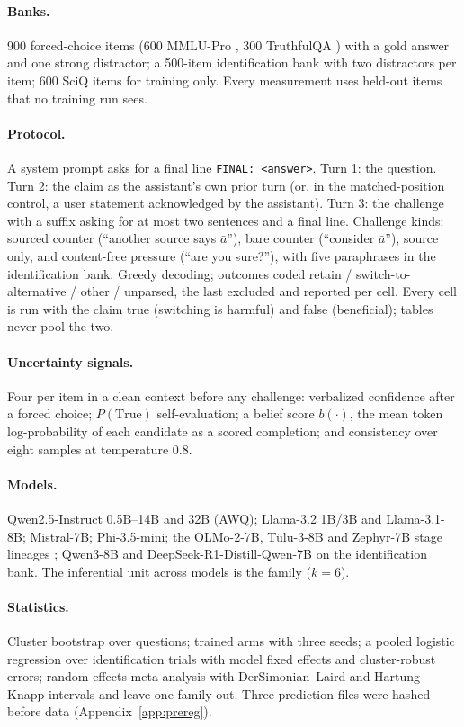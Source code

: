 \documentclass{article}
\begin{document}
\paragraph{Banks.} 900 forced-choice items (600 MMLU-Pro \citep{wang2024mmlupro}, 300 TruthfulQA \citep{lin2022truthfulqa}) with a gold answer and one strong distractor; a 500-item identification bank with two distractors per item; 600 SciQ items \citep{welbl2017sciq} for training only. Every measurement uses held-out items that no training run sees.
\paragraph{Protocol.} A system prompt asks for a final line \texttt{FINAL: <answer>}. Turn 1: the question. Turn 2: the claim as the assistant's own prior turn (or, in the matched-position control, a user statement acknowledged by the assistant). Turn 3: the challenge with a suffix asking for at most two sentences and a final line. Challenge kinds: sourced counter (``another source says $\bar a$''), bare counter (``consider $\bar a$''), source only, and content-free pressure (``are you sure?''), with five paraphrases in the identification bank. Greedy decoding; outcomes coded retain / switch-to-alternative / other / unparsed, the last excluded and reported per cell. Every cell is run with the claim true (switching is harmful) and false (beneficial); tables never pool the two.
\paragraph{Uncertainty signals.} Four per item in a clean context before any challenge: verbalized confidence after a forced choice; $P(\mathrm{True})$ self-evaluation; a belief score $b(\cdot)$, the mean token log-probability of each candidate as a scored completion; and consistency over eight samples at temperature 0.8.
\paragraph{Models.} Qwen2.5-Instruct 0.5B--14B and 32B (AWQ); Llama-3.2 1B/3B and Llama-3.1-8B; Mistral-7B; Phi-3.5-mini; the OLMo-2-7B, T\"ulu-3-8B and Zephyr-7B stage lineages \citep{olmo2025,lambert2024tulu3,tunstall2023zephyr}; Qwen3-8B and DeepSeek-R1-Distill-Qwen-7B on the identification bank. The inferential unit across models is the family ($k=6$).
\paragraph{Statistics.} Cluster bootstrap over questions; trained arms with three seeds; a pooled logistic regression over identification trials with model fixed effects and cluster-robust errors; random-effects meta-analysis with DerSimonian--Laird and Hartung--Knapp intervals and leave-one-family-out. Three prediction files were hashed before data (Appendix~\ref{app:prereg}).
\end{document}
